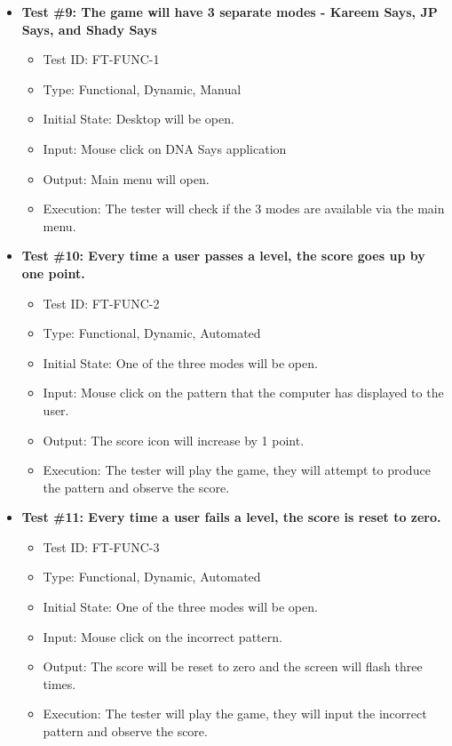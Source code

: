 \documentclass[12pt, titlepage]{article}
\begin{document}
\begin{itemize}

\item \textbf{Test \#9: The game will have 3 separate modes - Kareem Says, JP Says, and Shady Says }
\begin{itemize}
\item Test ID: FT-FUNC-1
\item Type: Functional, Dynamic, Manual 		
\item Initial State: Desktop will be open.					
\item Input: Mouse click on DNA Says application	
\item Output: Main menu will open.					
\item Execution: The tester will check if the 3 modes are available via the main menu.
\end{itemize}

\item \textbf{Test \#10: Every time a user passes a level, the score goes up by one point.}
\begin{itemize}
\item Test ID: FT-FUNC-2
\item Type: Functional, Dynamic, Automated		
\item Initial State: One of the three modes will be open.					
\item Input: Mouse click on the pattern that the computer has displayed to the user.					
\item Output: The score icon will increase by 1 point. 					
\item Execution: The tester will play the game, they will attempt to produce the pattern and observe the score.
\end{itemize}

\item \textbf{Test \#11: Every time a user fails a level, the score is reset to zero.}
\begin{itemize}
\item Test ID: FT-FUNC-3
\item Type: Functional, Dynamic, Automated	
\item Initial State: One of the three modes will be open.					
\item Input: Mouse click on the incorrect pattern.					
\item Output: The score will be reset to zero and the screen will flash three times. 					
\item Execution: The tester will play the game, they will input the incorrect pattern and observe the score.
\end{itemize}


\end{itemize}
\end{document}
